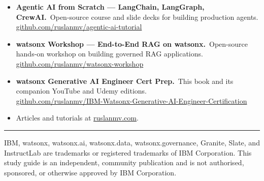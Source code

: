 \begin{itemize}[leftmargin=*]
    \item \textbf{Agentic AI from Scratch --- LangChain, LangGraph, CrewAI.}\ Open-source course and slide decks for building production agents.\\
          \href{https://github.com/ruslanmv/agentic-ai-tutorial}{github.com/ruslanmv/agentic-ai-tutorial}
    \item \textbf{watsonx Workshop --- End-to-End RAG on watsonx.}\ Open-source hands-on workshop on building governed RAG applications.\\
          \href{https://github.com/ruslanmv/watsonx-workshop}{github.com/ruslanmv/watsonx-workshop}
    \item \textbf{watsonx Generative AI Engineer Cert Prep.}\ This book and its companion YouTube and Udemy editions.\\
          \href{https://github.com/ruslanmv/IBM-Watsonx-Generative-AI-Engineer-Certification}{github.com/ruslanmv/IBM-Watsonx-Generative-AI-Engineer-Certification}
    \item Articles and tutorials at \href{https://ruslanmv.com}{ruslanmv.com}.
\end{itemize}

\vspace{1cm}

\noindent\rule{\linewidth}{0.4pt}

\medskip

\small\noindent
IBM, watsonx, watsonx.ai, watsonx.data, watsonx.governance, Granite, Slate, and InstructLab are trademarks or registered trademarks of IBM Corporation. This study guide is an independent, community publication and is not authorised, sponsored, or otherwise approved by IBM Corporation.

\cleardoublepage

